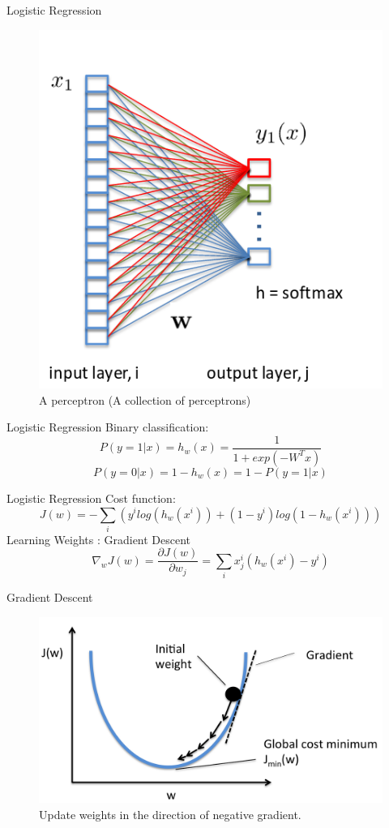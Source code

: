 ﻿\documentclass[table,aspectratio=43,mathserif,xcolor={usenames,dvipsnames,svgnames,table},10pt]{beamer}
\begin{document}
\begin{frame}{Logistic Regression}
 \begin{figure}[h]
    \includegraphics[width=0.5\linewidth]{images/lr.png}  
    \caption{A perceptron (A collection of perceptrons)}
  \end{figure}
\end{frame}

\begin{frame}{Logistic Regression}
Binary classification:
$$P(y = 1 | x) = h_w(x) = \frac{1}{1 + exp(-W^T x)}$$
$$P(y = 0 | x) = 1 - h_w(x) = 1 - P(y = 1 | x)$$
\end{frame}

\begin{frame}{Logistic Regression}
 Cost function: 
 $$ J(w) = - \sum_{i} ( y^i log(h_w(x^i)) + (1 - y^i) log(1 - h_w(x^i))  ) $$
 Learning Weights : Gradient Descent
 $$\nabla_w J(w) = \frac{\partial J(w)}{\partial w_j} = \sum_i x^i_j (h_w(x^i) - y^i) $$
\end{frame}

\begin{frame}{Gradient Descent}
\begin{figure}[h]
    \includegraphics[width=0.7\linewidth]{images/gd.png}  
    \caption{Update weights in the direction of negative gradient.}
  \end{figure}
\end{frame}
\end{document}
